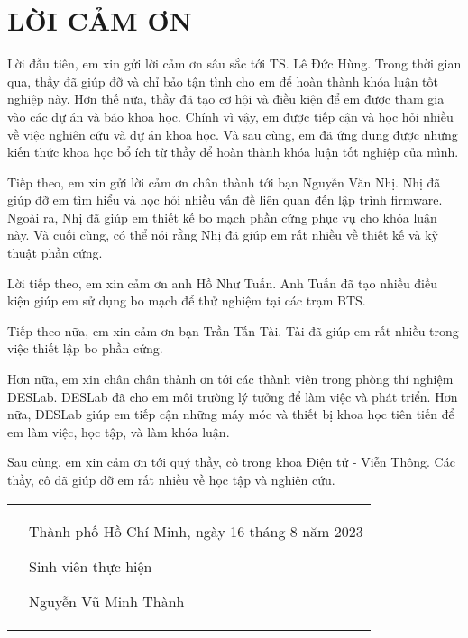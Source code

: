 \chapter*{LỜI CẢM ƠN}
\label{thanks}

Lời đầu tiên, em xin gửi lời cảm ơn sâu sắc tới TS. Lê Đức Hùng. Trong thời gian qua, thầy đã giúp đỡ và chỉ bảo tận tình cho em để hoàn thành khóa luận tốt nghiệp này. Hơn thế nữa, thầy đã tạo cơ hội và điều kiện để em được tham gia vào các dự án và báo khoa học. Chính vì vậy, em được tiếp cận và học hỏi nhiều về việc nghiên cứu và dự án khoa học. Và sau cùng, em đã ứng dụng được những kiến thức khoa học bổ ích từ thầy để hoàn thành khóa luận tốt nghiệp của mình.

Tiếp theo, em xin gửi lời cảm ơn chân thành tới bạn Nguyễn Văn Nhị. Nhị đã giúp đỡ em tìm hiểu và học hỏi nhiều vấn đề liên quan đến lập trình firmware. Ngoài ra, Nhị đã giúp em thiết kế bo mạch phần cứng phục vụ cho khóa luận này. Và cuối cùng, có thể nói rằng Nhị đã giúp em rất nhiều về thiết kế và kỹ thuật phần cứng.

Lời tiếp theo, em xin cảm ơn anh Hồ Như Tuấn. Anh Tuấn đã tạo nhiều điều kiện giúp em sử dụng bo mạch để thử nghiệm tại các trạm BTS.

Tiếp theo nữa, em xin cảm ơn bạn Trần Tấn Tài. Tài đã giúp em rất nhiều trong việc thiết lập bo phần cứng.

Hơn nữa, em xin chân chân thành ơn tới các thành viên trong phòng thí nghiệm DESLab. DESLab đã cho em môi trường lý tưởng để làm việc và phát triển. Hơn nữa, DESLab giúp em tiếp cận những máy móc và thiết bị khoa học tiên tiến để em làm việc, học tập, và làm khóa luận.

Sau cùng, em xin cảm ơn tới quý thầy, cô trong khoa Điện tử - Viễn Thông. Các thầy, cô đã giúp đỡ em rất nhiều về học tập và nghiên cứu.

\begin{table}[h]
\begin{tabular}{p{}p{}}
 &
 \begin{center}
Thành phố Hồ Chí Minh, ngày 16 tháng 8 năm 2023

Sinh viên thực hiện

\vspace{3cm}
Nguyễn Vũ Minh Thành
 \end{center}
\end{tabular}
\end{table}
